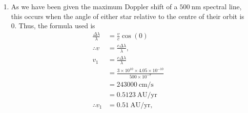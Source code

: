 \documentclass[a4paper,11pt]{article}
\newcommand{\ds}{\displaystyle}
\begin{document}
{{\begin{enumerate}[leftmargin=*]
\begin{enumerate}[label=\alph*)]
\begin{align*}
										 & = \frac{4\pi^2 \left(1.496\times 10^{13}\right)^3}{6.674\times 10^{-11}\times \left(2.349\times 10^{10}\right)^2} \\
										 & = 3.589238201\times 10^30\:\text{kg} \\
										 & = 1.804544093\:\text{M}_{\odot} \\
					\therefore m_1 + m_2 & = 1.8 \:\text{M}_{\odot}
				\end{align*}
			\item As we have been given the maximum Doppler shift of a $\ds{500\:}$nm spectral line, this occurs when the angle of either star relative to the centre of their orbit is $\ds{0}$. Thus, the formula used is
				\begin{align*}
					\frac{\Delta \lambda}{\lambda} & = \frac{v}{c} \cos({0}) \\
					\therefore v & = \frac{c\Delta \lambda}{\lambda}, \\
					v_1 & = \frac{c\Delta \lambda}{\lambda} \\
						& = \frac{3\times 10^{10} \times 4.05\times 10^{-10}}{500\times 10^{-7}} \\
						& = 243000\:\text{cm/s} \\
						& = 0.5123\:\text{AU/yr} \\
					\therefore v_1 & = 0.51\:\text{AU/yr}, 	
				\end{align*}
				\pagebreak


\end{enumerate}
\end{enumerate}}}
\end{document}
